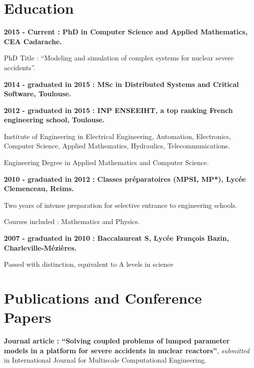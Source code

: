 \documentclass{article}
\renewenvironment{itemize}{
  \begin{list}{}{
      \setlength{\leftmargin}{1.5em}
      \setlength{\itemsep}{0.25em}
      \setlength{\parskip}{0pt}
      \setlength{\parsep}{0.25em}
    }
}{
  \end{list}
}
\begin{document}
\section*{Education}
\begin{itemize}
  	\item \textbf{2015 - Current : PhD in Computer Science and Applied Mathematics, CEA Cadarache.}
		\begin{itemize}
			\item PhD Title : ``Modeling and simulation of complex systems for nuclear severe accidents''.
		\end{itemize}
	\item \textbf{2014 - graduated in 2015 : MSc in Distributed Systems and Critical Software, Toulouse.}
    	\item \textbf{2012 - graduated in 2015 : INP ENSEEIHT, a top ranking French engineering school, Toulouse.}
		\begin{itemize}
			\item Institute of Engineering in Electrical Engineering, Automation, Electronics, Computer Science, Applied Mathematics, Hydraulics, Telecommunications.
			\item Engineering Degree in Applied Mathematics and Computer Science.
		\end{itemize}
	\item \textbf{2010 - graduated in 2012 : Classes préparatoires (MPSI, MP*), Lycée Clemenceau, Reims.}
		\begin{itemize}
			\item Two years of intense preparation for selective entrance to engineering schools.
			\item Courses included : Mathematics and Physics.
		\end{itemize}
	\item \textbf{2007 - graduated in 2010 : Baccalaureat S, Lycée François Bazin, Charleville-Mézières.}
		\begin{itemize}
			\item Passed with distinction, equivalent to A levels in science
		\end{itemize}
\end{itemize}

\section*{Publications and Conference Papers}
\begin{itemize}
	\item \textbf{Journal article : ``Solving coupled problems of lumped parameter models in a platform for severe accidents in nuclear reactors''}, \textit{submitted} in International Journal for Multiscale Computational Engineering.
\end{itemize}  
\end{document}
